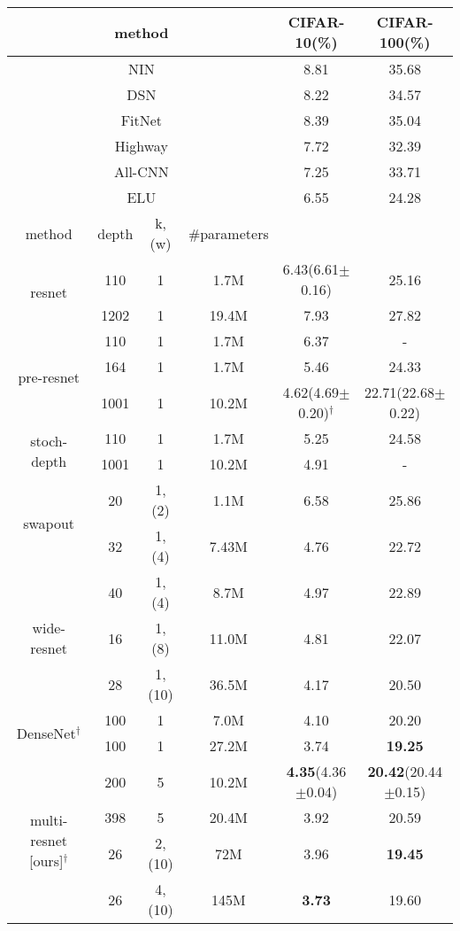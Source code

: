\documentclass[journal]{IEEEtran}
\begin{document}
\begin{table*}[!htp]
\centering
\begin{tabular}{||c c c c|c |c||} 
\hline
\multicolumn{4}{||c|}{method} & CIFAR-10(\%) & CIFAR-100(\%)\\
\hline
\hline
\multicolumn{4}{||c|}{NIN\cite{lin2013network}} & 8.81 & 35.68\\
\multicolumn{4}{||c|}{DSN\cite{lee2015deeply}} & 8.22 & 34.57\\
\multicolumn{4}{||c|}{FitNet\cite{romero2014fitnets}} & 8.39 & 35.04\\
\multicolumn{4}{||c|}{Highway\cite{srivastava2015training}} & 7.72 & 32.39\\
\multicolumn{4}{||c|}{All-CNN\cite{springenberg2014striving}} & 7.25 & 33.71\\
\multicolumn{4}{||c|}{ELU\cite{clevert2015fast}} & 6.55 & 24.28\\

\hline
\hline
method & depth & k,(w) & \#parameters & &  \\
\hline
\hline

\multirow{2}{8em}{resnet\cite{he2015deep}} 
& 110 & 1 & 1.7M & 6.43\tiny(6.61$\pm$0.16) & 25.16 \\ 
& 1202 & 1 & 19.4M & 7.93 & 27.82 \\ 
\hline
\multirow{3}{8em}{pre-resnet\cite{he2016identity}} 
& 110 & 1& 1.7M & 6.37 & - \\ 
& 164 & 1& 1.7M & 5.46 & 24.33 \\ 
& 1001 & 1& 10.2M & 4.62\tiny(4.69$\pm$0.20)$^\dagger$ & 22.71\tiny(22.68$\pm$0.22) \\ 
\hline
\multirow{2}{8em}{stoch-depth\cite{huang2016deep}} 
& 110 & 1 & 1.7M & 5.25 & 24.58 \\ 
& 1001 & 1 & 10.2M & 4.91 & - \\ 
\hline
\multirow{2}{8em}{swapout\cite{singh2016swapout}} 
& 20 & 1,(2) & 1.1M & 6.58 & 25.86 \\ 

& 32 & 1,(4) & 7.43M & 4.76 & 22.72 \\ 
\hline
\multirow{3}{8em}{wide-resnet\cite{zagoruyko2016wide}} 
& 40 & 1,(4) & 8.7M & 4.97 & 22.89 \\ 
& 16 & 1,(8) & 11.0M & 4.81 & 22.07 \\ 
& 28 & 1,(10) & 36.5M & 4.17 & 20.50 \\ 

\hline
\multirow{2}{8em}{DenseNet\cite{huang2016densely}$^\dagger$} 
& 100 & 1 & 7.0M & 4.10 & 20.20 \\ 
& 100 & 1 & 27.2M & 3.74 & \textbf{19.25} \\ 
\hline
\multirow{4}{8em}{multi-resnet [ours]$^\dagger$} 
& 200 & 5 & 10.2M & \textbf{4.35}\tiny(4.36$\pm$0.04)& \textbf{20.42}\tiny(20.44$\pm$0.15)\\
& 398 & 5 & 20.4M & 3.92 & 20.59 \\
& 26 & 2,(10) & 72M & 3.96 & \textbf{19.45} \\ 
& 26 & 4,(10) &  145M& \textbf{3.73} & 19.60 \\ 



\end{tabular}
\end{table*}
\end{document}
